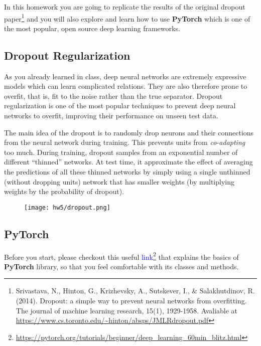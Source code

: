 \documentclass{article}
\begin{document}
In this homework you are going to replicate the results of the original dropout paper\footnote{Srivastava, N., Hinton, G., Krizhevsky, A., Sutskever, I., \& Salakhutdinov, R. (2014). Dropout: a simple way to prevent neural networks from overfitting. The journal of machine learning research, 15(1), 1929-1958. Avaliable at \url{https://www.cs.toronto.edu/~hinton/absps/JMLRdropout.pdf}} and you will also explore and learn how to use \textbf{PyTorch} which is one of the most popular, open source deep learning frameworks.

\subsection{Dropout Regularization}
As you already learned in class, deep neural networks are extremely expressive models which can learn complicated relations. They are also therefore prone to overfit, that is, fit to the noise rather than the true separator. Dropout regularization is one of the most popular techniques to prevent deep neural networks to overfit, improving their performance on unseen test data.

The main idea of the dropout is to randomly drop neurons and their connections from the neural network during training. This prevents units from \textit{co-adapting} too much. During training, dropout samples from an exponential number of different “thinned” networks. At test time,
it approximate the effect of averaging the predictions of all these thinned networks
by simply using a single unthinned (without dropping units) network that has smaller weights (by multiplying weights by the probability of dropout).

\begin{figure}[H]
\begin{center}
\texttt{[image: hw5/dropout.png]}
\end{center}
\end{figure}


\subsection{PyTorch}

Before you start, please checkout this useful \textcolor{blue}{link}\footnote{\url{https://pytorch.org/tutorials/beginner/deep_learning_60min_blitz.html}} that explains the basics of \textbf{PyTorch} library, so that you feel comfortable with its classes and methods.
\vspace{5mm}
\end{document}
